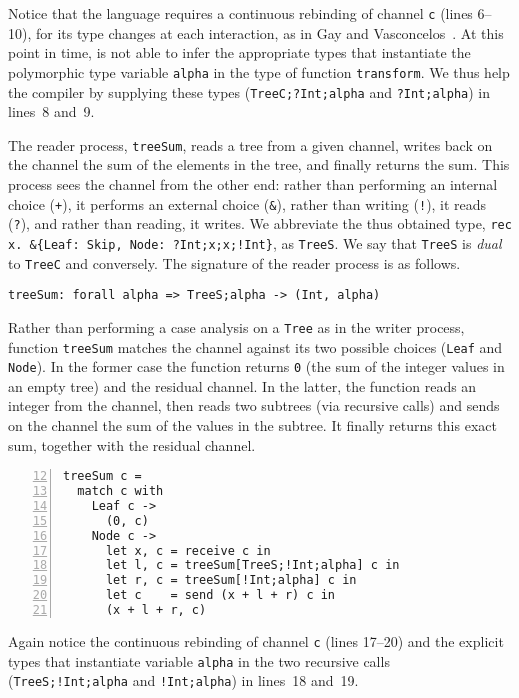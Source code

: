 Notice that the language requires a continuous rebinding of channel
\lstinline|c| (lines 6--10), for its type changes at each interaction,
as in Gay and Vasconcelos~\cite{DBLP:journals/jfp/GayV10}.
%
At this point in time, \freest{} is not able to infer the appropriate
types that instantiate the polymorphic type variable \lstinline|alpha|
in the type of function \lstinline|transform|. We thus help the
compiler by supplying these types (\lstinline|TreeC;?Int;alpha| and
\lstinline|?Int;alpha|) in lines~8 and~9.

The reader process, \lstinline|treeSum|, reads a tree from a given
channel, writes back on the channel the sum of the elements in the
tree, and finally returns the sum. This process sees the channel from
the other end: rather than performing an internal choice
(\lstinline|+|), it performs an external choice (\lstinline|&|),
rather than writing (\lstinline|!|), it reads (\lstinline|?|), and
rather than reading, it writes. We abbreviate the thus obtained type,
\lstinline|rec x. &{Leaf: Skip, Node: ?Int;x;x;!Int}|, as
\lstinline|TreeS|. We say that \lstinline|TreeS| is \emph{dual} to
\lstinline|TreeC| and conversely. The signature of the reader process
is as follows.
%
\begin{lstlisting}
treeSum: forall alpha => TreeS;alpha -> (Int, alpha)
\end{lstlisting}

Rather than performing a case analysis on a \lstinline|Tree| as in the
writer process, function \lstinline|treeSum| matches the channel
against its two possible choices (\lstinline|Leaf| and
\lstinline|Node|). In the former case the function returns
\lstinline|0| (the sum of the integer values in an empty tree) and the
residual channel. In the latter, the function reads an integer from
the channel, then reads two subtrees (via recursive calls) and sends
on the channel the sum of the values in the subtree. It finally
returns this exact sum, together with the residual channel.
%
\label{lst:treeSum}
\begin{lstlisting}[numbers=left,firstnumber=12, xleftmargin=\parindent]
treeSum c =
  match c with
    Leaf c ->
      (0, c)
    Node c ->
      let x, c = receive c in
      let l, c = treeSum[TreeS;!Int;alpha] c in
      let r, c = treeSum[!Int;alpha] c in
      let c    = send (x + l + r) c in
      (x + l + r, c)
\end{lstlisting}

Again notice the continuous rebinding of channel \lstinline|c| (lines
17--20) and the explicit types that instantiate variable
\lstinline|alpha| in the two recursive calls
(\lstinline|TreeS;!Int;alpha| and \lstinline|!Int;alpha|) in lines~18
and~19.

